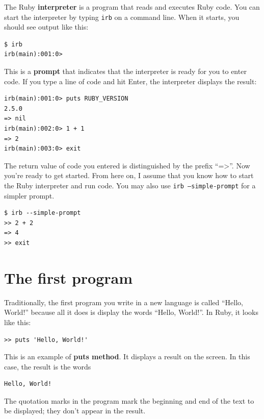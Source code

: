 \documentclass[10pt]{book}
\begin{document}
The Ruby {\bf interpreter} is a program that reads and executes
Ruby code.  You can start the interpreter by typing {\tt irb} on
a command line.  When it starts, you should see output like this:

\begin{verbatim}
$ irb
irb(main):001:0> 
\end{verbatim}
%
This is a {\bf prompt} that indicates that the interpreter is
ready for you to enter code.  If you type a line of code and
hit Enter, the interpreter displays the result: 

\begin{verbatim}
irb(main):001:0> puts RUBY_VERSION
2.5.0
=> nil
irb(main):002:0> 1 + 1
=> 2
irb(main):003:0> exit
\end{verbatim}
%
The return value of code you entered is distinguished
by the prefix ``=>''.  Now you're ready to get started.
From here on, I assume that you know how to start the Ruby
interpreter and run code.  You may also use {\tt irb --simple-prompt}
for a simpler prompt.

\begin{verbatim}
$ irb --simple-prompt
>> 2 + 2
=> 4
>> exit
\end{verbatim}
%



\section{The first program}
\label{hello}

Traditionally, the first program you write in a new language
is called ``Hello, World!'' because all it does is display the
words ``Hello, World!''.  In Ruby, it looks like this:

\begin{verbatim}
>> puts 'Hello, World!'
\end{verbatim}
%
This is an example of {\bf puts method}.  It displays a result on the
screen.  In this case, the result is the words

\begin{verbatim}
Hello, World!
\end{verbatim}
%
The quotation marks in the program mark the beginning and end
of the text to be displayed; they don't appear in the result.
\end{document}
